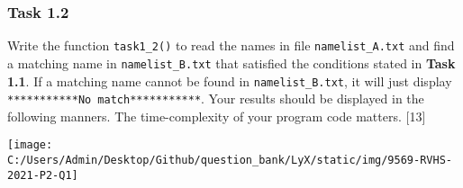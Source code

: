 \subsubsection*{Task 1.2 }

Write the function \texttt{task1\_2()} to read the names in file \texttt{\textquotedbl namelist\_A.txt\textquotedbl}
and find a matching name in \textquotedbl\texttt{namelist\_B.txt}\textquotedbl{}
that satisfied the conditions stated in \textbf{Task 1.1}. If a matching
name cannot be found in \textquotedbl\texttt{namelist\_B.txt}\textquotedbl ,
it will just display \textquotedbl\texttt{{*}{*}{*}{*}{*}{*}{*}{*}{*}{*}{*}No
match{*}{*}{*}{*}{*}{*}{*}{*}{*}{*}{*}}\textquotedbl . Your results
should be displayed in the following manners. The time-complexity
of your program code matters. \hfill{}{[}13{]}
\begin{center}
\texttt{[image: C:/Users/Admin/Desktop/Github/question\_bank/LyX/static/img/9569-RVHS-2021-P2-Q1]}
\par\end{center}